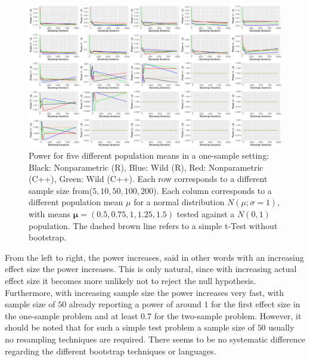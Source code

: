 \begin{figure}
\centering
	\includegraphics[scale=0.4]{./figures/plot_t2s2.pdf}
	\caption[Power Two Sample]{Power for five different population means in a one-sample setting: Black: Nonparametric (R), Blue: Wild (R), Red: Nonparametric (C++), Green: Wild (C++). Each row corresponds to a different sample size from($5, 10, 50, 100, 200$). Each column corresponds to a different population mean $\mu$ for a normal distribution $N(\mu; \sigma = 1)$, with means $\mathbf{\mu} = (0.5, 0.75, 1, 1.25, 1.5)$ tested against a $N(0,1)$ population. The dashed brown line refers to a simple t-Test without bootstrap.}
	\label{fig:t2_s2}
\end{figure}

From the left to right, the power increases, said in other words with an increasing effect size the power increases. This is only natural, since with increasing actual effect size it becomes more unlikely not to reject the null hypothesis. Furthermore, with increasing sample size the power increases very fast, with sample size of $50$ already reporting a power of around $1$ for the first effect size in the one-sample problem and at least $0.7$ for the two-sample problem. However, it should be noted that for such a simple test problem a sample size of $50$ usually no resampling techniques are required. There seems to be no systematic difference regarding the different bootstrap techniques or languages.